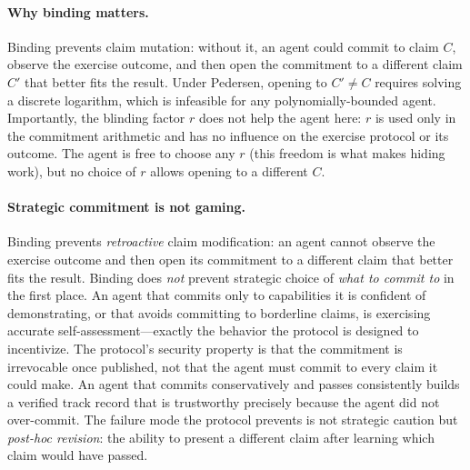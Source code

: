 \paragraph{Why binding matters.}
Binding prevents claim mutation: without it, an agent could commit
to claim $C$, observe the exercise outcome, and then open the
commitment to a different claim $C'$ that better fits the result.
Under Pedersen, opening to $C' \neq C$ requires solving a discrete
logarithm, which is infeasible for any polynomially-bounded agent.
Importantly, the blinding factor $r$ does not help the agent here:
$r$ is used only in the commitment arithmetic and has no influence
on the exercise protocol or its outcome.  The agent is free to
choose any $r$ (this freedom is what makes hiding work), but no
choice of $r$ allows opening to a different $C$.

\paragraph{Strategic commitment is not gaming.}
Binding prevents \emph{retroactive} claim modification: an agent
cannot observe the exercise outcome and then open its commitment to
a different claim that better fits the result.  Binding does
\emph{not} prevent strategic choice of \emph{what to commit to} in
the first place.  An agent that commits only to capabilities it is
confident of demonstrating, or that avoids committing to borderline
claims, is exercising accurate self-assessment---exactly the
behavior the protocol is designed to incentivize.  The protocol's
security property is that the commitment is irrevocable once
published, not that the agent must commit to every claim it could
make.  An agent that commits conservatively and passes consistently
builds a verified track record that is trustworthy precisely because
the agent did not over-commit.  The failure mode the protocol
prevents is not strategic caution but \emph{post-hoc revision}:
the ability to present a different claim after learning which claim
would have passed.

